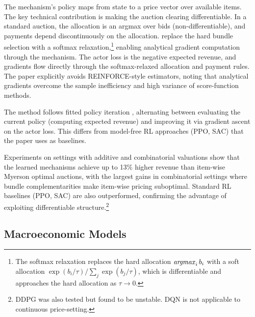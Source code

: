 The mechanism's policy maps from state to a price vector over available items. The key technical contribution is making the auction clearing differentiable. In a standard auction, the allocation is an argmax over bids (non-differentiable), and payments depend discontinuously on the allocation. \citet{RavindranathEtAl2024} replace the hard bundle selection with a softmax relaxation,\footnote{The softmax relaxation replaces the hard allocation $\mathop{\it argmax}_i b_i$ with a soft allocation $\exp(b_i/\tau)/\sum_j \exp(b_j/\tau)$, which is differentiable and approaches the hard allocation as $\tau \to 0$.} enabling analytical gradient computation through the mechanism. The actor loss is the negative expected revenue, and gradients flow directly through the softmax-relaxed allocation and payment rules. The paper explicitly avoids REINFORCE-style estimators, noting that analytical gradients overcome the sample inefficiency and high variance of score-function methods.

The method follows fitted policy iteration \citep{bertsekastsitsiklis1996}, alternating between evaluating the current policy (computing expected revenue) and improving it via gradient ascent on the actor loss. This differs from model-free RL approaches (PPO, SAC) that the paper uses as baselines.

Experiments on settings with additive and combinatorial valuations show that the learned mechanisms achieve up to 13\% higher revenue than item-wise Myerson optimal auctions, with the largest gains in combinatorial settings where bundle complementarities make item-wise pricing suboptimal. Standard RL baselines (PPO, SAC) are also outperformed, confirming the advantage of exploiting differentiable structure.\footnote{DDPG was also tested but found to be unstable. DQN is not applicable to continuous price-setting.}


\subsection{Macroeconomic Models}


